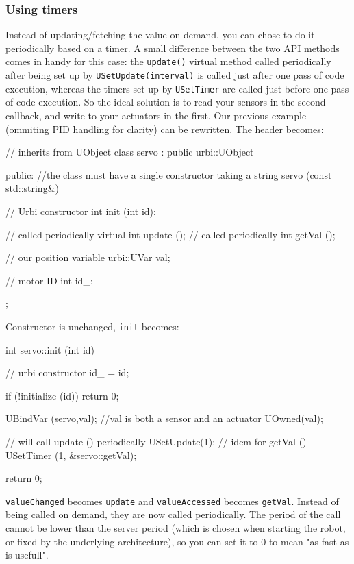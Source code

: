 \subsubsection{Using timers}

Instead of updating/fetching the value on demand, you can chose to do
it periodically based on a timer. A small difference between the two
API methods comes in handy for this case: the \lstinline{update()} virtual method
called periodically after being set up by \lstinline{USetUpdate(interval)} is
called just after one pass of \urbi code execution, whereas the timers
set up by \lstinline{USetTimer} are called just before one pass of \urbi code
execution. So the ideal solution is to read your sensors in the second
callback, and write to your actuators in the first. Our previous
example (ommiting PID handling for clarity) can be rewritten. The
header becomes:

\begin{cxx}
// inherits from UObject
class servo : public urbi::UObject
{
public:
  //the class must have a single constructor taking a string
  servo (const std::string&)

  // Urbi constructor
  int init (int id);

  // called periodically
  virtual int update ();
  // called periodically
  int getVal ();

  // our position variable
  urbi::UVar val;

  // motor ID
  int id_;
};
\end{cxx}

Constructor is unchanged, \lstinline{init} becomes:

\begin{cxx}
int
servo::init (int id)
{
  // urbi constructor
  id_ = id;

  if (!initialize (id))
    return 0;

  UBindVar (servo,val);
  //val is both a sensor and an actuator
  UOwned(val);

  // will call update () periodically
  USetUpdate(1);
  // idem for getVal ()
  USetTimer (1, &servo::getVal);

  return 0;
}
\end{cxx}

\lstinline{valueChanged} becomes \lstinline{update} and
\lstinline{valueAccessed} becomes \lstinline{getVal}. Instead of being
called on demand, they are now called periodically. The period of the
call cannot be lower than the server period (which is chosen when
starting the robot, or fixed by the underlying architecture), so you
can set it to 0 to mean "as fast as is usefull".

